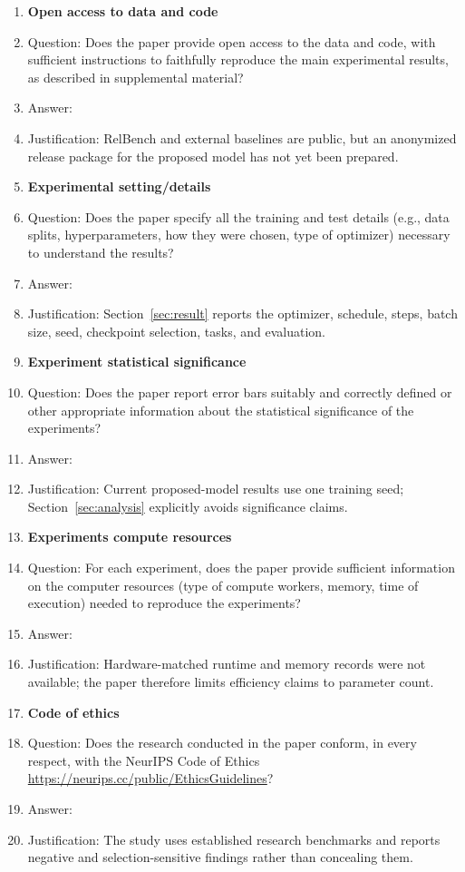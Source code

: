 \begin{enumerate}
\item \textbf{Open access to data and code}
  \item[] Question: Does the paper provide open access to the data and code, with sufficient instructions to faithfully reproduce the main experimental results, as described in supplemental material?
  \item[] Answer: \answerNo{}
  \item[] Justification: RelBench and external baselines are public, but an
  anonymized release package for the proposed model has not yet been prepared.

\item \textbf{Experimental setting/details}
  \item[] Question: Does the paper specify all the training and test details (e.g., data splits, hyperparameters, how they were chosen, type of optimizer) necessary to understand the results?
  \item[] Answer: \answerYes{}
  \item[] Justification: Section~\ref{sec:result} reports the optimizer,
  schedule, steps, batch size, seed, checkpoint selection, tasks, and evaluation.

\item \textbf{Experiment statistical significance}
  \item[] Question: Does the paper report error bars suitably and correctly defined or other appropriate information about the statistical significance of the experiments?
  \item[] Answer: \answerNo{}
  \item[] Justification: Current proposed-model results use one training seed;
  Section~\ref{sec:analysis} explicitly avoids significance claims.

\item \textbf{Experiments compute resources}
  \item[] Question: For each experiment, does the paper provide sufficient information on the computer resources (type of compute workers, memory, time of execution) needed to reproduce the experiments?
  \item[] Answer: \answerNo{}
  \item[] Justification: Hardware-matched runtime and memory records were not
  available; the paper therefore limits efficiency claims to parameter count.

\item \textbf{Code of ethics}
  \item[] Question: Does the research conducted in the paper conform, in every respect, with the NeurIPS Code of Ethics \url{https://neurips.cc/public/EthicsGuidelines}?
  \item[] Answer: \answerYes{}
  \item[] Justification: The study uses established research benchmarks and
  reports negative and selection-sensitive findings rather than concealing them.


\end{enumerate}
